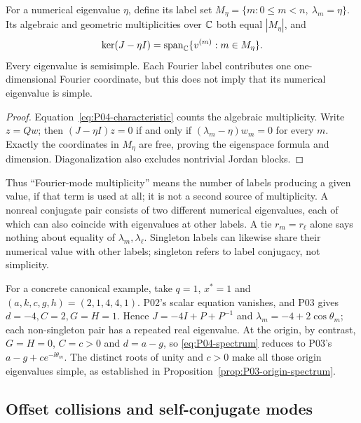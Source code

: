 \begin{proposition}
\label{prop:P04-multiplicity}
For a numerical eigenvalue $\eta$, define its label set
$M_\eta=\{m:0\le m<n,\ \lambda_m=\eta\}$.
Its algebraic and geometric multiplicities over $\mathbb{C}$ both equal
$|M_\eta|$, and
\[
 \ker(J-\eta I)=\operatorname{span}_{\mathbb{C}}
                  \{v^{(m)}:m\in M_\eta\}.
\]
Every eigenvalue is semisimple. Each Fourier label contributes one
one-dimensional Fourier coordinate, but this does not imply that
its numerical eigenvalue is simple.
\end{proposition}
\begin{proof}
Equation~\eqref{eq:P04-characteristic} counts the algebraic
multiplicity. Write $z=Qw$; then $(J-\eta I)z=0$ if and only if
$(\lambda_m-\eta)w_m=0$ for every $m$. Exactly the coordinates in
$M_\eta$ are free, proving the eigenspace formula and dimension.
Diagonalization also excludes nontrivial Jordan blocks.
\end{proof}

Thus ``Fourier-mode multiplicity'' means the number of labels
producing a given value, if that term is used at all; it is not a
second source of multiplicity. A nonreal conjugate pair consists
of two different numerical eigenvalues, each of which can also
coincide with eigenvalues at other labels. A tie $r_m=r_\ell$
alone says nothing about equality of $\lambda_m,\lambda_\ell$.
Singleton labels can likewise share their numerical value with
other labels; singleton refers to label conjugacy, not simplicity.

For a concrete canonical example, take $q=1$, $x^*=1$ and
$(a,k,c,g,h)=(2,1,4,4,1)$. P02's scalar equation vanishes,
and P03 gives $d=-4,C=2,G=H=1$. Hence
$J=-4I+P+P^{-1}$ and $\lambda_m=-4+2\cos\theta_m$;
each non-singleton pair has a repeated real eigenvalue.
At the origin, by contrast, $G=H=0$, $C=c>0$ and $d=a-g$,
so \eqref{eq:P04-spectrum} reduces to P03's
$a-g+ce^{-\ii\theta_m}$. The distinct roots of unity and $c>0$
make all those origin eigenvalues simple, as established in
Proposition~\ref{prop:P03-origin-spectrum}.

\subsection{Offset collisions and self-conjugate modes}
\label{slot:P04-extra-1}

